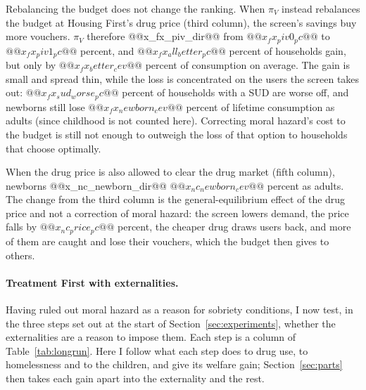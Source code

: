 \documentclass[10pt]{article}
\begin{document}
Rebalancing the budget does not change the ranking. When $\pi_V$ instead rebalances the budget at Housing First's drug price (third column), the screen's savings buy more vouchers. $\pi_V$ therefore @@x_fx_piv_dir@@ from $@@x_fx_piv0_pc@@$ to $@@x_fx_piv1_pc@@$ percent, and $@@x_fx_all_better_pc@@$ percent of households gain, but only by $@@x_fx_better_cev@@$ percent of consumption on average. The gain is small and spread thin, while the loss is concentrated on the users the screen takes out: $@@x_fx_sud_worse_pc@@$ percent of households with a SUD are worse off, and newborns still lose $@@x_fx_newborn_cev@@$ percent of lifetime consumption as adults (since childhood is not counted here). Correcting moral hazard's cost to the budget is still not enough to outweigh the loss of that option to households that choose optimally.

When the drug price is also allowed to clear the drug market (fifth column), newborns @@x_nc_newborn_dir@@ $@@x_nc_newborn_cev@@$ percent as adults. The change from the third column is the general-equilibrium effect of the drug price and not a correction of moral hazard: the screen lowers demand, the price falls by $@@x_nc_price_pc@@$ percent, the cheaper drug draws users back, and more of them are caught and lose their vouchers, which the budget then gives to others.

\paragraph{Treatment First with externalities.} Having ruled out moral hazard as a reason for sobriety conditions, I now test, in the three steps set out at the start of Section~\ref{sec:experiments}, whether the externalities are a reason to impose them. Each step is a column of Table~\ref{tab:longrun}. Here I follow what each step does to drug use, to homelessness and to the children, and give its welfare gain; Section~\ref{sec:parts} then takes each gain apart into the externality and the rest.
\end{document}
